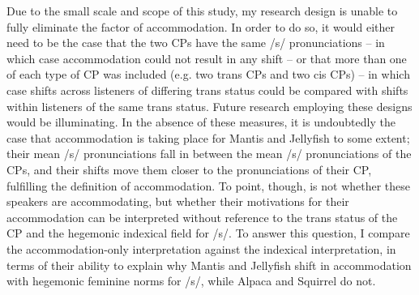 \documentclass[12pt,twoside]{reedthesis}
\begin{document}
Due to the small scale and scope of this study, my research design is unable to fully eliminate the factor of accommodation. In order to do so, it would either need to be the case that the two CPs have the same /s/ pronunciations -- in which case accommodation could not result in any shift -- or that more than one of each type of CP was included (e.g. two trans CPs and two cis CPs) -- in which case shifts across listeners of differing trans status could be compared with shifts within listeners of the same trans status. Future research employing these designs would be illuminating. In the absence of these measures, it is undoubtedly the case that accommodation is taking place for Mantis and Jellyfish to some extent; their mean /s/ pronunciations fall in between the mean /s/ pronunciations of the CPs, and their shifts move them closer to the pronunciations of their CP, fulfilling the definition of accommodation. To point, though, is not whether these speakers are accommodating, but whether their motivations for their accommodation can be interpreted without reference to the trans status of the CP and the hegemonic indexical field for /s/. To answer this question, I compare the accommodation-only interpretation against the indexical interpretation, in terms of their ability to explain why Mantis and Jellyfish shift in accommodation with hegemonic feminine norms for /s/, while Alpaca and Squirrel do not.

\end{document}
